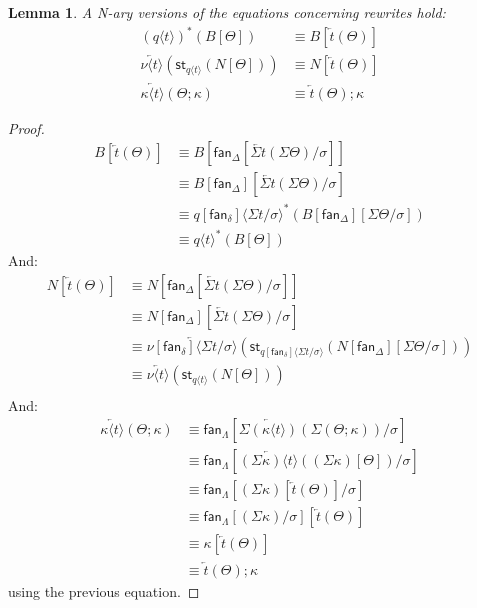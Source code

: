 \documentclass[10pt]{article}
\newtheorem{lemma}{Lemma}
\theoremstyle{definition}
\newcommand\fan[1]{\ensuremath{\mathsf{fan}_{#1}}}
\newcommand{\rewrite}[2]{\overleftarrow{#1}(#2)}
\newcommand\St[2]{\ensuremath{{#1}^*(#2)}}
\newcommand\StI[2]{\ensuremath{\mathsf{st}_{#1}(#2)}}
\newcommand\ap[2]{\ensuremath{#1 \langle #2 \rangle }}
\begin{document}
\begin{lemma}
A N-ary versions of the equations concerning rewrites hold:
\begin{align*}
\St{(\ap{q}{t})}{B[\Theta]} &\equiv B[\rewrite{t}{\Theta}] \\
\rewrite{\ap{\nu}{t}}{\StI{\ap{q}{t}}{N[\Theta]}} &\equiv N[\rewrite{t}{\Theta}] \\
\rewrite{\ap{\kappa}{t}}{\Theta;\kappa} &\equiv \rewrite{t}{\Theta};\kappa
\end{align*}
\end{lemma}
\begin{proof}
\begin{align*}
B[\rewrite{t}{\Theta}] 
&\equiv B[\fan{\Delta}[\rewrite{\Sigma t}{\Sigma \Theta}/\sigma]] \\
&\equiv B[\fan{\Delta}][\rewrite{\Sigma t}{\Sigma \Theta}/\sigma] \\
&\equiv \St{\ap{q[\fan{\delta}]}{\Sigma t / \sigma}}{B[\fan{\Delta}][\Sigma \Theta/\sigma]} \\
&\equiv \St{\ap{q}{t}}{B[\Theta]}
\end{align*}
And:
\begin{align*}
N[\rewrite{t}{\Theta}]
&\equiv N[\fan{\Delta}[\rewrite{\Sigma t}{\Sigma \Theta}/\sigma]] \\
&\equiv N[\fan{\Delta}][\rewrite{\Sigma t}{\Sigma \Theta}/\sigma] \\
&\equiv \rewrite{\ap{\nu[\fan{\delta}]}{\Sigma t/\sigma}}{\StI{\ap{q[\fan{\delta}]}{\Sigma t/\sigma}}{N[\fan{\Delta}][\Sigma \Theta/\sigma]}} \\
&\equiv \rewrite{\ap{\nu}{t}}{\StI{\ap{q}{t}}{N[\Theta]}} \\
\end{align*}
And:
\begin{align*}
\rewrite{\ap{\kappa}{t}}{\Theta;\kappa}
&\equiv \fan{\Lambda}[\rewrite{\Sigma(\ap{\kappa}{t})}{\Sigma (\Theta;\kappa)}/\sigma] \\
&\equiv \fan{\Lambda}[\rewrite{\ap{(\Sigma \kappa)}{t}}{(\Sigma \kappa)[\Theta]}/\sigma] \\
&\equiv \fan{\Lambda}[(\Sigma \kappa)[\rewrite{t}{\Theta}]/\sigma] \\
&\equiv \fan{\Lambda}[(\Sigma \kappa)/\sigma][\rewrite{t}{\Theta}] \\
&\equiv \kappa[\rewrite{t}{\Theta}] \\
&\equiv \rewrite{t}{\Theta};\kappa
\end{align*}
using the previous equation.
\end{proof}
\end{document}

